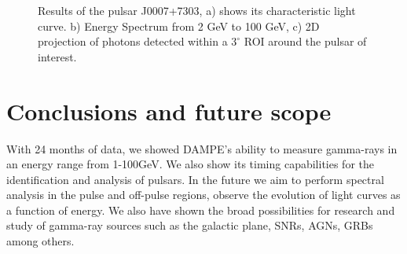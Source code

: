 \documentclass{PoS}
\begin{document}
\begin{figure}
\centering
{}
\caption{Results of the pulsar J0007+7303, a)  shows its characteristic  light curve. b) Energy Spectrum from 2 GeV to 100 GeV, c) 2D projection of photons detected within a $ 3^{\circ}$ ROI around the pulsar of interest.}
\label{j0007}
\end{figure}




\section{Conclusions and future scope}
With 24 months of  data, we showed DAMPE's ability to measure gamma-rays in an energy range from 1-100GeV.
We also show its timing capabilities for the identification and analysis of pulsars.
In the future we aim to perform spectral analysis in the pulse and off-pulse regions, observe the evolution of light curves  as a function of energy.
We also have shown the broad possibilities for research and study of gamma-ray sources such as the galactic plane, SNRs, AGNs, GRBs among others.
\end{document}
